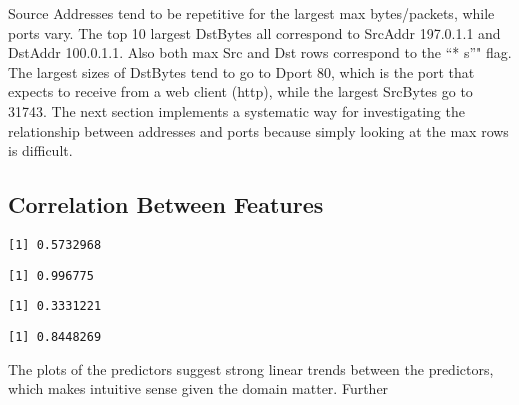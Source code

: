 \documentclass[12pt,twoside]{dukestatscithesis}
\theoremstyle{definition}
\theoremstyle{definition}
\theoremstyle{definition}
\theoremstyle{remark}
\begin{document}
Source Addresses tend to be repetitive for the largest max
bytes/packets, while ports vary. The top 10 largest DstBytes all
correspond to SrcAddr 197.0.1.1 and DstAddr 100.0.1.1. Also both max Src
and Dst rows correspond to the ``* s''" flag. The largest sizes of
DstBytes tend to go to Dport 80, which is the port that expects to
receive from a web client (http), while the largest SrcBytes go to
31743. The next section implements a systematic way for investigating
the relationship between addresses and ports because simply looking at
the max rows is difficult.

\subsection{Correlation Between
Features}\label{correlation-between-features}
\begin{Shaded}
\begin{Highlighting}[]
\end{Highlighting}
\end{Shaded}
\begin{verbatim}
[1] 0.5732968
\end{verbatim}
\begin{Shaded}
\begin{Highlighting}[]
\end{Highlighting}
\end{Shaded}
\begin{verbatim}
[1] 0.996775
\end{verbatim}
\begin{Shaded}
\begin{Highlighting}[]
\end{Highlighting}
\end{Shaded}
\begin{verbatim}
[1] 0.3331221
\end{verbatim}
\begin{Shaded}
\begin{Highlighting}[]
\end{Highlighting}
\end{Shaded}
\begin{verbatim}
[1] 0.8448269
\end{verbatim}
The plots of the predictors suggest strong linear trends between the
predictors, which makes intuitive sense given the domain matter. Further
\end{document}
